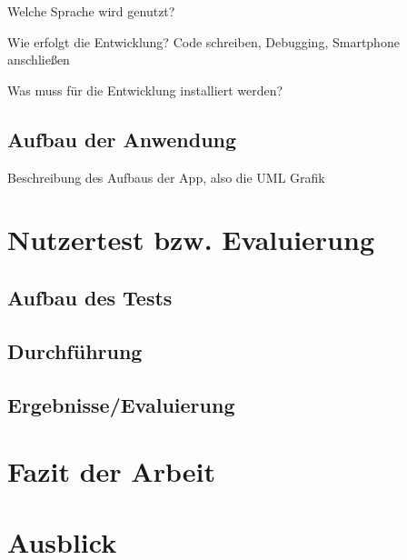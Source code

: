 Welche Sprache wird genutzt?

Wie erfolgt die Entwicklung? Code schreiben, Debugging, Smartphone anschließen

Was muss für die Entwicklung installiert werden?

\subsection{Aufbau der Anwendung}
Beschreibung des Aufbaus der App, also die UML Grafik

\section{Nutzertest bzw. Evaluierung}
\subsection{Aufbau des Tests}
\subsection{Durchführung}
\subsection{Ergebnisse/Evaluierung}

\section{Fazit der Arbeit}
\section{Ausblick}